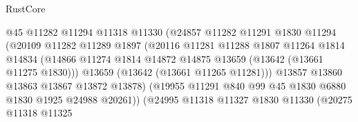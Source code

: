 \begin{lexlean}{RustCore}
\begin{coremodule}
                                    @45
                                    @11282
                                    @11294
                                    @11318
                                    @11330
                                    (@24857
                                      @11282
                                      @11291
                                      @1830
                                      @11294
                                      (@20109
                                        @11282
                                        @11289
                                        @1897
                                        (@20116
                                          @11281
                                          @11288
                                          @1807
                                          @11264
                                          @1814
                                          @14834
                                          (@14866
                                            @11274
                                            @1814
                                            @14872
                                            @14875
                                            @13659
                                            (@13642 (@13661 @11275 @1830)))
                                          @13659
                                          (@13642 (@13661 @11265 @11281)))
                                        @13857
                                        @13860
                                        @13863
                                        @13867
                                        @13872
                                        @13878)
                                      (@19955
                                        @11291
                                        @840
                                        @99
                                        @45
                                        @1830
                                        @6880
                                        @1830
                                        @1925
                                        @24988
                                        @20261))
                                    (@24995
                                      @11318
                                      @11327
                                      @1830
                                      @11330
                                      (@20275
                                        @11318
                                        @11325

\end{coremodule}
\end{lexlean}
